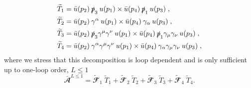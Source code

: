 \begin{align} 
\label{tensors_henn_D1} \widetilde T_1 &= {\bar u} (p_2)\: \slashed p_3 \: { u} (p_1) \times   {\bar u} (p_4) \: \slashed p_1 \:{ u}(p_3) \; , \\
\label{tensors_henn_D2} \widetilde T_2 &= {\bar u} (p_2)\: \gamma^\alpha \: { u} (p_1) \times {\bar u} (p_4) \: \gamma_\alpha \:{ u}(p_3) \; , \\
\label{tensors_henn_D3} \widetilde T_3 &= {\bar u} (p_2)\: \slashed p_3   \gamma^\mu   \gamma^\nu \: { u} (p_1) \times   {\bar u} (p_4) \:
 \slashed p_1 \gamma_\mu  \gamma_\nu  \:{ u}(p_3) \; , \\
\label{tensors_henn_D4} \widetilde T_4 &= {\bar u} (p_2)\: \gamma^\alpha \gamma^\mu  \gamma^\nu \: { u} (p_1) \times {\bar u} (p_4) \: \gamma_\alpha  \gamma_\mu   \gamma_\nu \:{ u}(p_3) \; , 
\end{align} 
where we stress that this decomposition is loop dependent and is only sufficient up to one-loop order, $L \leq 1$
\begin{equation}\label{decomp_tensors_henn}
\bar{\mathbfcal{A}}^{L \leq 1}  =   \widetilde{\mathbfcal{F}}_1 \; \widetilde{T}_1 + \widetilde{\mathbfcal{F}}_2 \; \widetilde{T}_2 + \widetilde{\mathbfcal{F}}_3 \; \widetilde{T}_3 + \widetilde{\mathbfcal{F}}_4 \; \widetilde{T}_4.
\end{equation}

